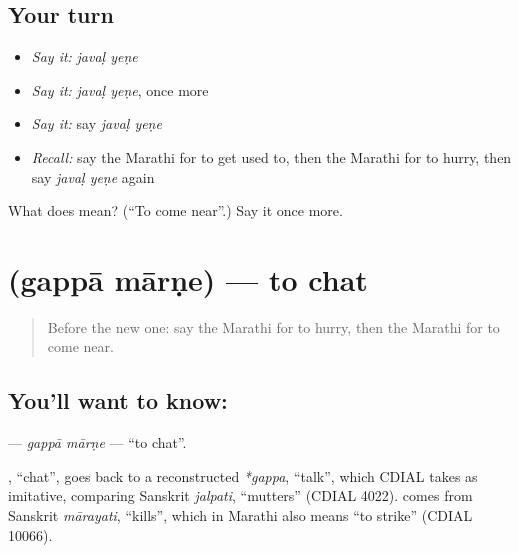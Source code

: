 \subsection*{Your turn}
\begin{itemize}
\raggedright
  \item \emph{Say it:} \emph{javaḷ yeṇe}
  \item \emph{Say it:} \emph{javaḷ yeṇe}, once more
  \item \emph{Say it:} say \emph{javaḷ yeṇe}
  \item \emph{Recall:} say the Marathi for to get used to, then the Marathi for to hurry, then say \emph{javaḷ yeṇe} again
\end{itemize}

\begin{tcolorbox}[breakable,colback=teal!4,colframe=teal!35!black,title={Before you move on}]
What does   mean? (\textquotedblleft{}To come near\textquotedblright{}.) Say it once more.
\end{tcolorbox}
\section[\texorpdfstring{\mr{गप्पा} \mr{मारणे} (gappā mārṇe)}{गप्पा मारणे (gappā mārṇe)}]{  (gappā mārṇe) — to chat}

\label{lesson:MR-C197-gappa-marne}



\begin{quote}
Before the new one: say the Marathi for to hurry, then the Marathi for to come near.
\end{quote}

\subsection*{You'll want to know:  }
\textbf{ } — \emph{gappā mārṇe} — \textquotedblleft{}to chat\textquotedblright{}.

\begin{cousinweb}
\textbf{}, \textquotedblleft{}chat\textquotedblright{}, goes back to a reconstructed \emph{*gappa}, \textquotedblleft{}talk\textquotedblright{}, which CDIAL takes as imitative, comparing Sanskrit \emph{jalpati}, \textquotedblleft{}mutters\textquotedblright{} (CDIAL 4022). \textbf{} comes from Sanskrit \emph{mārayati}, \textquotedblleft{}kills\textquotedblright{}, which in Marathi also means \textquotedblleft{}to strike\textquotedblright{} (CDIAL 10066).
\end{cousinweb}

